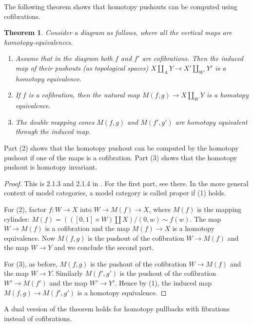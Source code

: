 \documentclass{scrartcl}
\theoremstyle{plain}
\newtheorem{theorem}{Theorem}[section]
\theoremstyle{definition}
\renewcommand{\coprod}{\mathbin{\amalg}}
\begin{document}
The following theorem shows that homotopy pushouts can be computed using cofibrations. 
\begin{theorem}\label{thm:homotopy-pushout-properties}
    Consider a diagram as follows, where all the vertical maps are homotopy-equivalences.
    \begin{center}
    \end{center}
    \begin{enumerate}
    \item Assume that in the diagram 
    both $f$ and $f'$ are cofibrations. Then the induced map of their pushouts (as topological spaces) $X\coprod_A Y \to X'\coprod_{W'} Y'$ is a homotopy equivalence.
    \item If $f$ is a cofibration, then the natural map $M(f,g)\to X\coprod_W Y$ is a homotopy equivalence. 
    \item The double mapping cones $M(f, g)$ and $M(f', g')$ are homotopy equivalent through the induced map.
    \end{enumerate}
\end{theorem}
Part (2) shows that the homotopy pushout can be computed by the homotopy pushout if one of the maps is a cofibration. Part (3) shows that the homotopy pushout is homotopy invariant.
\begin{proof}
This is 2.1.3 and 2.1.4 in \cite{may2011more}. For the first part, see there. In the more general context of model categories, a model category is called proper if (1) holds. 

For (2), factor $f\colon W\to X$ into $W\to M(f)\to X$, where $M(f)$ is the mapping cylinder: $M(f) = (([0,1]\times W)\coprod X) / (0, w)\sim f(w)$. The map $W\to M(f)$ is a cofibration and the map $M(f)\to X$ is a homotopy equivalence. Now $M(f, g)$ is the pushout of the cofibration $W\to M(f)$ and the map $W\to Y$ and we conclude the second part. 

For (3), as before, $M(f, g)$ is the pushout of the cofibration $W\to M(f)$ and the map $W\to Y$. Similarly $M(f', g')$ is the pushout of the cofibration $W'\to M(f')$ and the map $W'\to Y'$. Hence by (1), the induced map $M(f, g)\to M(f', g')$ is a homotopy equivalence. 
\end{proof}
A dual version of the theorem holds for homotopy pullbacks with fibrations instead of cofibrations.
\end{document}
